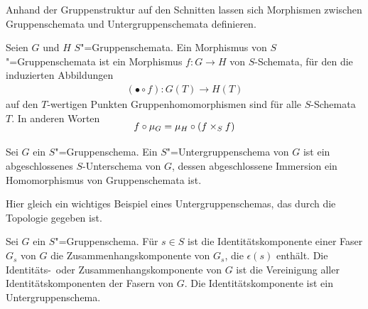 Anhand der Gruppenstruktur auf den Schnitten lassen sich
Morphismen zwischen Gruppenschemata und Untergruppenschemata
definieren.
\begin{Definition}
  Seien $G$ und $H$ $S$"=Gruppenschemata.
  Ein Morphismus von $S$"=Gruppenschemata ist ein Morphismus $f\colon
  G\to H$ von $S$-Schemata, für den die induzierten Abbildungen
  \begin{gather*}
    (\bullet\circ f)\colon G(T)\to H(T)
  \end{gather*}auf den $T$-wertigen Punkten
  Gruppenhomomorphismen sind für alle $S$-Schemata $T$.
  In anderen Worten
  \begin{gather*}
    \SwapAboveDisplaySkip
    f\circ\mu_G = \mu_H\circ(f\times_S f)
  \end{gather*}
\end{Definition}

\begin{Definition}[Untergruppenschema]
  Sei $G$ ein $S$"=Gruppenschema.
  Ein $S$"=Untergruppenschema von $G$ ist ein abgeschlossenes
  $S$-Unterschema von $G$, dessen abgeschlossene Immersion ein
  Homomorphismus von Gruppenschemata ist.
\end{Definition}

Hier gleich ein wichtiges Beispiel eines Untergruppenschemas, das
durch die Topologie gegeben ist.
\begin{Definition}[Identitätskomponente]
  Sei $G$ ein $S$"=Gruppenschema.
  Für $s\in S$ ist die Identitätskomponente einer Faser $G_s$ von $G$
  die Zusammenhangskomponente von $G_s$, die $\epsilon(s)$ enthält.
  Die Identitäts-~oder Zusammenhangskomponente von $G$ ist
  die Vereinigung aller Identitätskomponenten der Fasern von $G$.
  Die Identitätskomponente ist ein Untergruppenschema.
\end{Definition}

